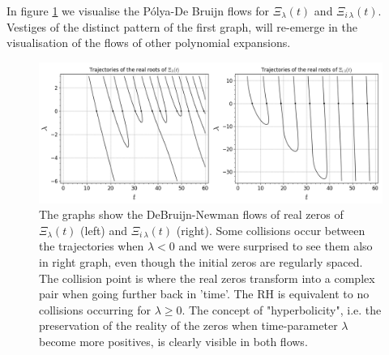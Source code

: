 \documentclass[a4paper,11pt,twoside]{amsart}
\begin{document}
\pagebreak

In figure \ref{fig:poldebruijnflow} we visualise the Pólya-De Bruijn flows for $\Xi_{\lambda}(t)$ and $\Xi_{i\,\lambda}(t)$. Vestiges of the distinct pattern of the first graph, will re-emerge in the visualisation of the flows of other polynomial expansions.

\begin{figure}[H]
  \includegraphics[width=1\linewidth]{PolyaDeBruijnFlowdouble.jpeg}
  \caption{The graphs show the DeBruijn-Newman flows of real zeros of $\Xi_{\lambda}(t)$ (left) and $\Xi_{i\,\lambda}(t)$ (right). Some collisions occur between the trajectories when $\lambda < 0$ and we were surprised to see them also in right graph, even though the initial zeros are regularly spaced. The collision point is where the real zeros transform into a complex pair when going further back in 'time'. The RH is equivalent to no collisions occurring for $\lambda \ge 0$. The concept of "hyperbolicity", i.e. the preservation of the reality of the zeros when time-parameter $\lambda$ become more positives, is clearly visible in both flows.}
  \label{fig:poldebruijnflow}
\end{figure}
\end{document}
